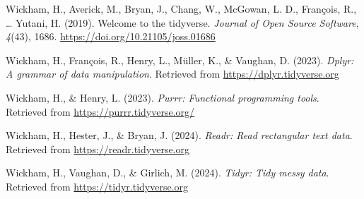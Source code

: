 \documentclass[
  man,floatsintext]{apa6}
\newlength{\cslhangindent}
\newenvironment{CSLReferences}[2] %
 {\begin{list}{}{%
  \setlength{\itemindent}{0pt}
  \setlength{\leftmargin}{0pt}
  \setlength{\parsep}{0pt}
  \ifodd #1
   \setlength{\leftmargin}{\cslhangindent}
   \setlength{\itemindent}{-1\cslhangindent}
  \fi
  \setlength{\itemsep}{#2\baselineskip}}}
 {\end{list}}
\begin{document}
\begin{CSLReferences}{1}{0}
Wickham, H., Averick, M., Bryan, J., Chang, W., McGowan, L. D., François, R., \ldots{} Yutani, H. (2019). Welcome to the {tidyverse}. \emph{Journal of Open Source Software}, \emph{4}(43), 1686. \url{https://doi.org/10.21105/joss.01686}

Wickham, H., François, R., Henry, L., Müller, K., \& Vaughan, D. (2023). \emph{Dplyr: A grammar of data manipulation}. Retrieved from \url{https://dplyr.tidyverse.org}

Wickham, H., \& Henry, L. (2023). \emph{Purrr: Functional programming tools}. Retrieved from \url{https://purrr.tidyverse.org/}

Wickham, H., Hester, J., \& Bryan, J. (2024). \emph{Readr: Read rectangular text data}. Retrieved from \url{https://readr.tidyverse.org}

Wickham, H., Vaughan, D., \& Girlich, M. (2024). \emph{Tidyr: Tidy messy data}. Retrieved from \url{https://tidyr.tidyverse.org}

\end{CSLReferences}
\end{document}
